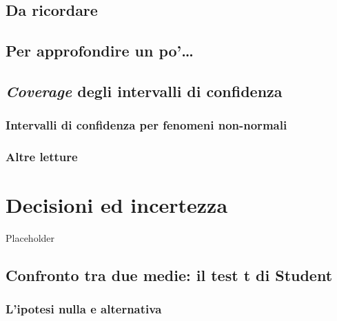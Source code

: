 \documentclass[a4paper,12pt,oneside]{book}
\begin{document}
\hypertarget{da-ricordare}{%
\section{Da ricordare}\label{da-ricordare}}

\hypertarget{per-approfondire-un-po}{%
\section{Per approfondire un po'\ldots{}}\label{per-approfondire-un-po}}

\hypertarget{coverage-degli-intervalli-di-confidenza}{%
\section{\texorpdfstring{\emph{Coverage} degli intervalli di confidenza}{Coverage degli intervalli di confidenza}}\label{coverage-degli-intervalli-di-confidenza}}

\hypertarget{intervalli-di-confidenza-per-fenomeni-non-normali}{%
\subsection{Intervalli di confidenza per fenomeni non-normali}\label{intervalli-di-confidenza-per-fenomeni-non-normali}}

\hypertarget{altre-letture-4}{%
\subsection{Altre letture}\label{altre-letture-4}}

\hypertarget{decisioni-ed-incertezza}{%
\chapter{Decisioni ed incertezza}\label{decisioni-ed-incertezza}}

Placeholder

\hypertarget{confronto-tra-due-medie-il-test-t-di-student}{%
\section{Confronto tra due medie: il test t di Student}\label{confronto-tra-due-medie-il-test-t-di-student}}

\hypertarget{lipotesi-nulla-e-alternativa}{%
\subsection{L'ipotesi nulla e alternativa}\label{lipotesi-nulla-e-alternativa}}
\end{document}
